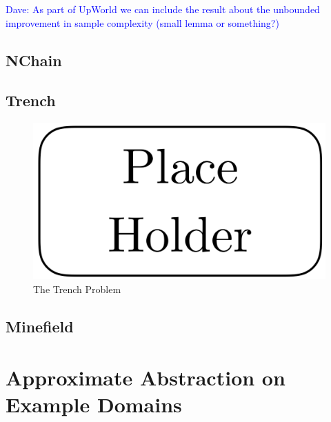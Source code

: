 \documentclass{article}
\newcommand\dnote[1]{\textcolor{blue}{Dave: #1}}
\begin{document}
\dnote{As part of UpWorld we can include the result about the unbounded improvement in sample complexity (small lemma or something?)}



\subsection{NChain}



\subsection{Trench}



\begin{figure}[h]
\centering
\includegraphics[width=0.42\columnwidth]{figures/placeholder.png}
\caption{The Trench Problem}
\label{fig:trench}
\end{figure}

\subsection{Minefield}


\section{Approximate Abstraction on Example Domains}
\end{document}
